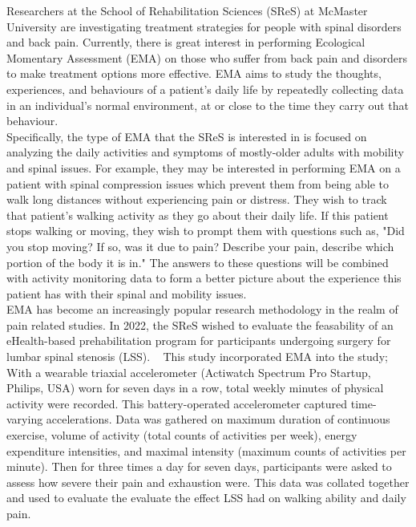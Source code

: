 \documentclass[12pt]{article}
\begin{document}
Researchers at the School of Rehabilitation Sciences (SReS) at McMaster University are investigating treatment strategies for people with spinal disorders and back pain. Currently, there is great interest in performing Ecological Momentary Assessment (EMA) on those who suffer from back pain and disorders to make treatment options more effective. EMA aims to study the thoughts, experiences, and behaviours of a patient's daily life by repeatedly collecting data in an individual's normal environment, at or close to the time they carry out that behaviour.\\

Specifically, the type of EMA that the SReS is interested in is focused on analyzing the daily activities and symptoms of mostly-older adults with mobility and spinal issues. For example, they may be interested in performing EMA on a patient with spinal compression issues which prevent them from being able to walk long distances without experiencing pain or distress. They wish to track that patient's walking activity as they go about their daily life. If this patient stops walking or moving, they wish to prompt them with questions such as, "Did you stop moving? If so, was it due to pain? Describe your pain, describe which portion of the body it is in." The answers to these questions will be combined with activity monitoring data to form a better picture about the experience this patient has with their spinal and mobility issues.\\

EMA has become an increasingly popular research methodology in the realm of pain related studies. In 2022, the SReS wished to evaluate the feasability of an eHealth-based prehabilitation program for participants undergoing surgery for lumbar spinal stenosis (LSS). ~\cite{MacedoPilotTrial} This study incorporated EMA into the study; With a wearable triaxial accelerometer (Actiwatch Spectrum Pro Startup, Philips, USA) worn for seven days in a row, total weekly minutes of physical activity were recorded. This battery-operated accelerometer captured time-varying accelerations. Data was gathered on maximum duration of continuous exercise, volume of activity (total counts of activities per week), energy expenditure intensities, and maximal intensity (maximum counts of activities per minute). Then for three times a day for seven days, participants were asked to assess how severe their pain and exhaustion were. This data was collated together and used to evaluate the evaluate the effect LSS had on walking ability and daily pain. \\
\end{document}
